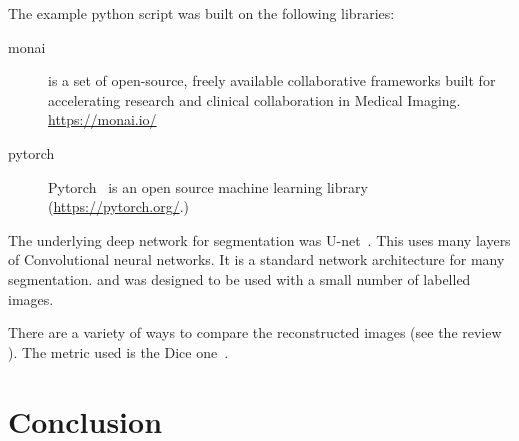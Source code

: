\documentclass[12pt]{article}
\begin{document}
The example python script was built on the following libraries:

\begin{description}

  \item[monai] is a set of open-source, freely available collaborative frameworks built for accelerating research and clinical collaboration in Medical Imaging.  \url{https://monai.io/}

\item[pytorch] Pytorch~\cite{paszke2019pytorch}
  is an open source machine learning library  (\url{https://pytorch.org/}.)
    
\end{description}

The underlying deep network for segmentation was
U-net~\cite{ronneberger2015u}. 
This uses many layers of Convolutional neural networks.
It is a standard network architecture for many segmentation.
and was designed to be used with a small number of labelled images.




There are a variety of ways to compare the reconstructed
images (see the review~\cite{taha2015metrics} ).
The metric used is the Dice one~\cite{zijdenbos1994morphometric}.

\section{Conclusion}



\end{document}
